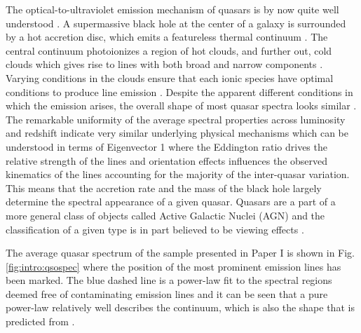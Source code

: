 The optical-to-ultraviolet emission mechanism of quasars is by now quite well
understood \citep{Elvis1994}. A supermassive black hole at the center of a
galaxy is surrounded by a hot accretion disc, which emits a featureless thermal
continuum \citep{Shakura1973, Pereyra2006}. The central continuum photoionizes a
region of hot clouds, and further out, cold clouds which gives rise to lines
with both broad and narrow components \citep{Elvis2001}.  Varying conditions in
the clouds ensure that each ionic species have optimal conditions to produce
line emission \citep{Baldwin1995}. Despite the apparent different conditions in
which the emission arises, the overall shape of most quasar spectra looks
similar
\citep{Dietrich2002}. The remarkable uniformity of the average spectral
properties across luminosity and redshift indicate very similar underlying
physical mechanisms which can be understood in terms of Eigenvector 1
\citep{Boroson1992, Francis1992} where the Eddington ratio drives the relative
strength of the lines and orientation effects influences the observed kinematics
of the lines \citep{Shen2014a} accounting for the majority of the inter-quasar
variation. This means that the accretion rate and the mass of the black hole
largely determine the spectral appearance of a given quasar. Quasars are a part
of a more general class of objects called Active Galactic Nuclei (AGN) and the
classification of a given type
is in part believed to be viewing effects
\citep{Elvis2001}.


The average quasar spectrum of the sample presented in Paper I is shown in Fig.
\ref{fig:intro:qsospec} where the position of the most prominent emission lines
has been marked. The blue dashed line is a power-law fit to the spectral regions
deemed free of contaminating emission lines and it can be seen that a pure
power-law relatively well describes the continuum, which is also the shape that
is predicted from \citet{Pereyra2006}.

